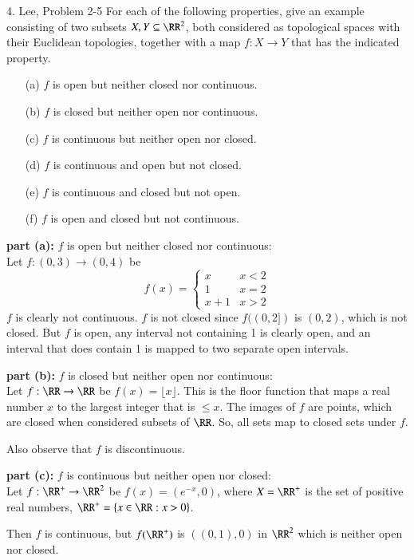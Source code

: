 \documentclass{homework}
\newcommand{\ra}{\rightarrow}
\begin{document}
\hrulefill
\begin{exercise}{4. Lee, Problem 2-5}
For each of the following properties, give an example consisting of two subsets
$X,Y\subseteq \RR^2$, both considered as topological spaces with their Euclidean
topologies, together with a map $f:X\ra Y$ that has the indicated property.
\begin{itemize}
\item[(a)] $f$ is open but neither closed nor continuous.
\item[(b)] $f$ is closed but neither open nor continuous.
\item[(c)] $f$ is continuous but neither open nor closed.
\item[(d)] $f$ is continuous and open but not closed.
\item[(e)] $f$ is continuous and closed but not open.
\item[(f)] $f$ is open and closed but not continuous.
\end{itemize}
\end{exercise}
\solution
\textbf{part (a): } $f$ is open but neither closed nor continuous:\\
Let $f:(0,3)\ra(0,4)$ be
$$f(x) = \begin{cases}
x & x<2 \\
1 & x=2 \\
x+1 & x>2
\end{cases}
$$
$f$ is clearly not continuous.  $f$ is not closed since $f((0,2])$ is
$(0,2)$, which is not closed.  But $f$ is open, any interval not
containing 1 is clearly open, and an interval that does contain 1
is mapped to two separate open intervals.

\textbf{part (b): } $f$ is closed but neither open nor continuous:\\
Let $f:\RR\ra\RR$ be $f(x)=\lfloor x\rfloor$.  This is the floor function
that maps a real number $x$ to the largest integer that is $\le x$.  The
images of $f$ are points, which are closed when considered subsets of
$\RR$.  So, all sets map to closed sets under $f$.

Also observe that $f$ is discontinuous.

\textbf{part (c): } $f$ is continuous but neither open nor closed:\\
Let $f:\RR^+\ra\RR^2$ be $f(x)=(e^{-x},0)$, where $X=\RR^+$ is the set of positive
real numbers, $\RR^+ = \{x\in\RR:x>0\}$.

Then $f$ is continuous, but $f(\RR^+)$ is $((0,1), 0)$ in $\RR^2$ which is
neither open nor closed.
\end{document}
